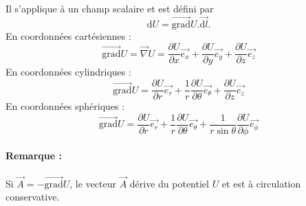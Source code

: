 \documentclass[12pt,a4paper]{article}
\newcommand{\ex}{\overrightarrow{e_x}}
\newcommand{\ey}{\overrightarrow{e_y}}
\newcommand{\ez}{\overrightarrow{e_z}}
\newcommand{\er}{\overrightarrow{e_r}}
\newcommand{\et}{\overrightarrow{e_\theta}}
\newcommand{\ep}{\overrightarrow{e_\phi}}
\renewcommand{\d}{\mathrm{d}}
\newcommand{\grad}{\overrightarrow{\mathrm{grad}}}
\begin{document}
Il s'applique à un champ scalaire et est défini par
\begin{equation*}
\d U = \grad U.\overrightarrow{\d l}.
\end{equation*}
En coordonnées cartésiennes :
\begin{equation*}
\grad U = \overrightarrow{\nabla} U = \frac{\partial U}{\partial x}\ex + \frac{\partial U}{\partial y}\ey + \frac{\partial U}{\partial z}\ez
\end{equation*}
En coordonnées cylindriques :
\begin{equation*}
\grad U = \frac{\partial U}{\partial r}\er + \frac{1}{r}\frac{\partial U}{\partial \theta}\et + \frac{\partial U}{\partial z}\ez
\end{equation*}
En coordonnées sphériques :
\begin{equation*}
\grad U = \frac{\partial U}{\partial r}\er + \frac{1}{r}\frac{\partial U}{\partial \theta}\et + \frac{1}{r\sin\theta}\frac{\partial U}{\partial \phi}\ep
\end{equation*}

\paragraph*{Remarque :} Si $\overrightarrow{A} = -\grad U$, le vecteur $\overrightarrow{A}$ dérive du potentiel $U$ et est à circulation conservative.
\end{document}
